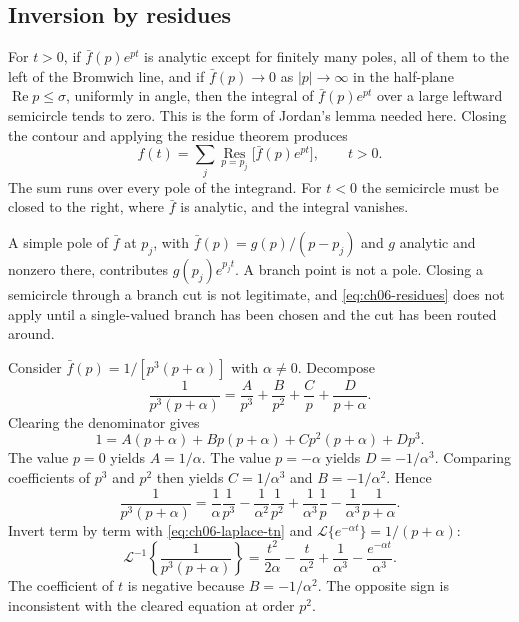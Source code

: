 \subsection{Inversion by residues}

For $t>0$, if $\bar f(p)e^{pt}$ is analytic except for finitely many poles, all of them to the left of the Bromwich line, and if $\bar f(p)\to 0$ as $|p|\to\infty$ in the half-plane $\operatorname{Re}p\leq\sigma$, uniformly in angle, then the integral of $\bar f(p)e^{pt}$ over a large leftward semicircle tends to zero. This is the form of Jordan's lemma needed here. Closing the contour and applying the residue theorem produces
\begin{equation}
f(t)=\sum_j\operatorname*{Res}_{p=p_j}\bigl[\bar f(p)e^{pt}\bigr],
\qquad t>0.
\label{eq:ch06-residues}
\end{equation}
The sum runs over every pole of the integrand. For $t<0$ the semicircle must be closed to the right, where $\bar f$ is analytic, and the integral vanishes.

A simple pole of $\bar f$ at $p_j$, with $\bar f(p)=g(p)/(p-p_j)$ and $g$ analytic and nonzero there, contributes $g(p_j)e^{p_j t}$. A branch point is not a pole. Closing a semicircle through a branch cut is not legitimate, and \eqref{eq:ch06-residues} does not apply until a single-valued branch has been chosen and the cut has been routed around.

\begin{example}
Consider $\bar f(p)=1/[p^3(p+\alpha)]$ with $\alpha\neq 0$. Decompose
\begin{equation}
\frac{1}{p^3(p+\alpha)}
=\frac{A}{p^3}+\frac{B}{p^2}+\frac{C}{p}+\frac{D}{p+\alpha}.
\end{equation}
Clearing the denominator gives
\begin{equation}
1=A(p+\alpha)+Bp(p+\alpha)+Cp^2(p+\alpha)+Dp^3.
\end{equation}
The value $p=0$ yields $A=1/\alpha$. The value $p=-\alpha$ yields $D=-1/\alpha^3$. Comparing coefficients of $p^3$ and $p^2$ then yields $C=1/\alpha^3$ and $B=-1/\alpha^2$. Hence
\begin{equation}
\frac{1}{p^3(p+\alpha)}
=\frac{1}{\alpha}\frac{1}{p^3}
-\frac{1}{\alpha^2}\frac{1}{p^2}
+\frac{1}{\alpha^3}\frac{1}{p}
-\frac{1}{\alpha^3}\frac{1}{p+\alpha}.
\end{equation}
Invert term by term with \eqref{eq:ch06-laplace-tn} and $\mathcal{L}\{e^{-\alpha t}\}=1/(p+\alpha)$:
\begin{equation}
\mathcal{L}^{-1}\left\{\frac{1}{p^3(p+\alpha)}\right\}
=\frac{t^2}{2\alpha}-\frac{t}{\alpha^2}+\frac{1}{\alpha^3}-\frac{e^{-\alpha t}}{\alpha^3}.
\label{eq:ch06-partial}
\end{equation}
The coefficient of $t$ is negative because $B=-1/\alpha^2$. The opposite sign is inconsistent with the cleared equation at order $p^2$.
\end{example}

